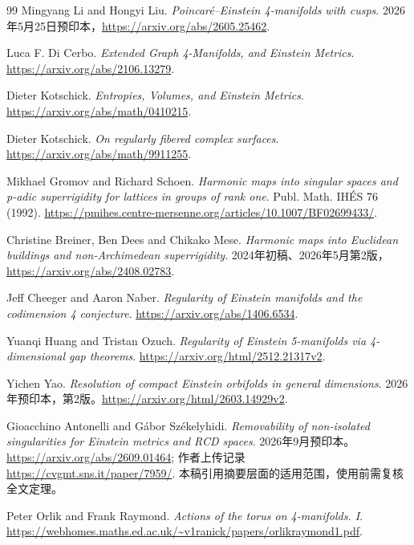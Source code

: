 \documentclass[UTF8,fontset=fandol,zihao=-4]{ctexart}
\theoremstyle{cn}
\begin{document}
\begin{thebibliography}{99}
 Mingyang Li and Hongyi Liu. \emph{Poincaré--Einstein 4-manifolds with cusps}. 2026年5月25日预印本，\url{https://arxiv.org/abs/2605.25462}.

 Luca F. Di Cerbo. \emph{Extended Graph 4-Manifolds, and Einstein Metrics}. \url{https://arxiv.org/abs/2106.13279}.

 Dieter Kotschick. \emph{Entropies, Volumes, and Einstein Metrics}. \url{https://arxiv.org/abs/math/0410215}.

 Dieter Kotschick. \emph{On regularly fibered complex surfaces}. \url{https://arxiv.org/abs/math/9911255}.

 Mikhael Gromov and Richard Schoen. \emph{Harmonic maps into singular spaces and p-adic superrigidity for lattices in groups of rank one}. Publ. Math. IHÉS 76 (1992). \url{https://pmihes.centre-mersenne.org/articles/10.1007/BF02699433/}.

 Christine Breiner, Ben Dees and Chikako Mese. \emph{Harmonic maps into Euclidean buildings and non-Archimedean superrigidity}. 2024年初稿、2026年5月第2版，\url{https://arxiv.org/abs/2408.02783}.

 Jeff Cheeger and Aaron Naber. \emph{Regularity of Einstein manifolds and the codimension 4 conjecture}. \url{https://arxiv.org/abs/1406.6534}.

 Yuanqi Huang and Tristan Ozuch. \emph{Regularity of Einstein 5-manifolds via 4-dimensional gap theorems}. \url{https://arxiv.org/html/2512.21317v2}.

 Yichen Yao. \emph{Resolution of compact Einstein orbifolds in general dimensions}. 2026年预印本，第2版。\url{https://arxiv.org/html/2603.14929v2}.

 Gioacchino Antonelli and Gábor Székelyhidi. \emph{Removability of non-isolated singularities for Einstein metrics and RCD spaces}. 2026年9月预印本。\url{https://arxiv.org/abs/2609.01464}; 作者上传记录\url{https://cvgmt.sns.it/paper/7959/}. 本稿引用摘要层面的适用范围，使用前需复核全文定理。

 Peter Orlik and Frank Raymond. \emph{Actions of the torus on 4-manifolds. I}. \url{https://webhomes.maths.ed.ac.uk/~v1ranick/papers/orlikraymond1.pdf}.

\end{thebibliography}
\end{document}
